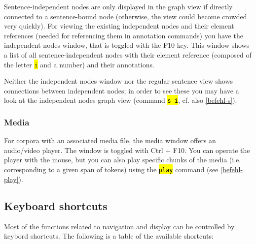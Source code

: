 \documentclass[12pt]{scrartcl}
\newcommand{\code}[1]{\hl{\texttt{#1}}}
\begin{document}
Sentence-independent nodes are only displayed in the graph view if directly connected to a sentence-bound node (otherwise, the view could become crowded very quickly).
For viewing the existing independent nodes and their element references (needed for referencing them in annotation commands) you have the independent nodes window, that is toggled with the F10 key.
This window shows a list of all sentence-independent nodes with their element reference (composed of the letter \code{i} and a number) and their annotations.

Neither the independent nodes window nor the regular sentence view shows connections between independent nodes; in order to see these you may have a look at the independent nodes graph view (command \code{s i}, cf. also \ref{befehl-s}).

\subsubsection{Media}\label{window-media}

For corpora with an associated media file, the media window offers an audio/video player.
The window is toggled with Ctrl + F10.
You can operate the player with the mouse, but you can also play specific chunks of the media (i.e. corresponding to a given span of tokens) using the \code{play} command (see \ref{befehl-play}).


\subsection{Keyboard shortcuts}\label{shortcuts}

Most of the functions related to navigation and display can be controlled by keybord shortcuts.
The following is a table of the available shortcuts:
\end{document}
